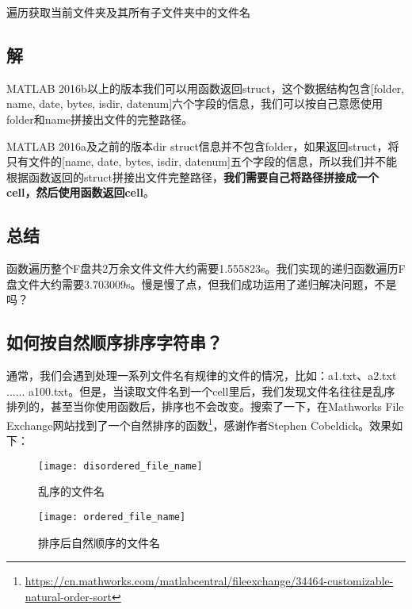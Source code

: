 \begin{algorithm}[h]
\caption{遍历获取当前文件夹及其所有子文件夹中的文件名}
\label{get_all_file_name}
\end{algorithm}

\subsection*{解}

MATLAB 2016b以上的版本我们可以用函数返回struct，这个数据结构包含[folder, name, date, bytes, isdir, datenum]六个字段的信息，我们可以按自己意愿使用folder和name拼接出文件的完整路径。


MATLAB 2016a及之前的版本dir struct信息并不包含folder，如果返回struct，将只有文件的[name, date, bytes, isdir, datenum]五个字段的信息，所以我们并不能根据函数返回的struct拼接出文件完整路径，\textbf{我们需要自己将路径拼接成一个cell，然后使用函数返回cell}。


\subsection*{总结}
函数遍历整个F盘共2万余文件文件大约需要1.555823s。我们实现的递归函数遍历F盘文件大约需要3.703009s。慢是慢了点，但我们成功运用了递归解决问题，不是吗？

\subsection{如何按自然顺序排序字符串？}

通常，我们会遇到处理一系列文件名有规律的文件的情况，比如：a1.txt、a2.txt ...... a100.txt。但是，当读取文件名到一个cell里后，我们发现文件名往往是乱序排列的，甚至当你使用函数后，排序也不会改变。搜索了一下，在Mathworks File Exchange网站找到了一个自然排序的函数\footnote{\url{https://cn.mathworks.com/matlabcentral/fileexchange/34464-customizable-natural-order-sort}}，感谢作者Stephen Cobeldick。效果如下：

\begin{figure}[h]
    \centering
    \begin{minipage}{0.45\textwidth}
        \centering
        \texttt{[image: disordered\_file\_name]}
        \caption{乱序的文件名}
    \end{minipage}
    \begin{minipage}{0.45\textwidth}
        \centering
        \texttt{[image: ordered\_file\_name]}
        \caption{排序后自然顺序的文件名}
    \end{minipage}
\end{figure}



